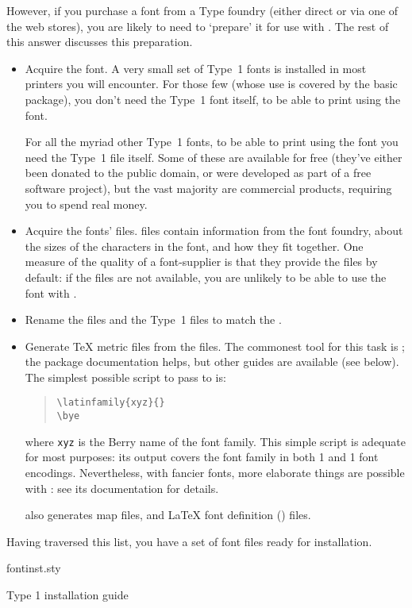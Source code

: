 However, if you purchase a font from a Type foundry (either direct or
via one of the web stores), you are likely to need to `prepare' it for
use with \AllTeX{}.  The rest of this answer discusses this preparation.
\begin{itemize}
\item Acquire the font.  A very small set of Type~1 fonts is installed
  in most \PS{} printers you will encounter.  For those few (whose use
  is covered by the basic  package), you don't need the
  Type~1 font itself, to be able to print using the font.

  For all the myriad other Type~1 fonts, to be able to print using
  the font you need the Type~1 file itself.  Some of these are
  available for free (they've either been donated to the public
  domain, or were developed as part of a free software project), but
  the vast majority are commercial products, requiring you to spend
  real money.
\item Acquire the fonts'  files.   files contain
  information from the font foundry, about the sizes of the characters
  in the font, and how they fit together.  One measure of the quality
  of a font-supplier is that they provide the  files by
  default: if the files are not available, you are unlikely to be able
  to use the font with \AllTeX{}.
\item Rename the  files and the Type~1 files to match the
  .
\item Generate \TeX{} metric files from the  files.  The
  commonest tool for this task is ; the package
  documentation helps, but other guides are available (see below).
  The simplest possible script to pass to  is:
  \begin{quote}
\begin{verbatim}
\latinfamily{xyz}{}
\bye
\end{verbatim}
  \end{quote}
  where \texttt{xyz} is the Berry name of the font family.  This
  simple script is adequate for most purposes: its output covers the
  font family in both 1 and 1 font encodings.  Nevertheless,
  with fancier fonts, more elaborate things are possible with
  : see its documentation for details.

   also generates map files, and \LaTeX{} font
  definition () files.
\end{itemize}
Having traversed this list, you have a set of font files ready for
installation.
\begin{ctanrefs}
\item[fontinst.sty]
\item[\nothtml{\rmfamily}Type 1 installation guide]
\end{ctanrefs}


